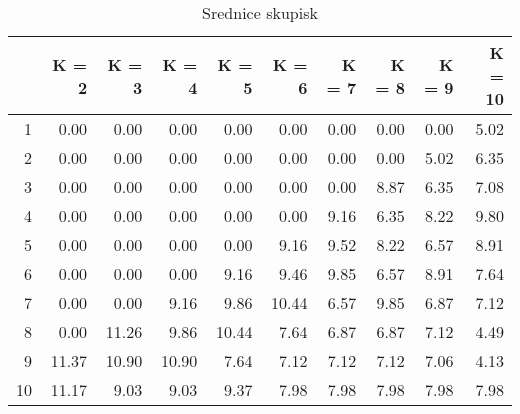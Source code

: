 \begin{table}[ht]
\centering
\begin{tabular}{rrrrrrrrrr}
  \hline
 & K = 2 & K = 3 & K = 4 & K = 5 & K = 6 & K = 7 & K = 8 & K = 9 & K = 10 \\ 
  \hline
1 & 0.00 & 0.00 & 0.00 & 0.00 & 0.00 & 0.00 & 0.00 & 0.00 & 5.02 \\ 
  2 & 0.00 & 0.00 & 0.00 & 0.00 & 0.00 & 0.00 & 0.00 & 5.02 & 6.35 \\ 
  3 & 0.00 & 0.00 & 0.00 & 0.00 & 0.00 & 0.00 & 8.87 & 6.35 & 7.08 \\ 
  4 & 0.00 & 0.00 & 0.00 & 0.00 & 0.00 & 9.16 & 6.35 & 8.22 & 9.80 \\ 
  5 & 0.00 & 0.00 & 0.00 & 0.00 & 9.16 & 9.52 & 8.22 & 6.57 & 8.91 \\ 
  6 & 0.00 & 0.00 & 0.00 & 9.16 & 9.46 & 9.85 & 6.57 & 8.91 & 7.64 \\ 
  7 & 0.00 & 0.00 & 9.16 & 9.86 & 10.44 & 6.57 & 9.85 & 6.87 & 7.12 \\ 
  8 & 0.00 & 11.26 & 9.86 & 10.44 & 7.64 & 6.87 & 6.87 & 7.12 & 4.49 \\ 
  9 & 11.37 & 10.90 & 10.90 & 7.64 & 7.12 & 7.12 & 7.12 & 7.06 & 4.13 \\ 
  10 & 11.17 & 9.03 & 9.03 & 9.37 & 7.98 & 7.98 & 7.98 & 7.98 & 7.98 \\ 
   \hline
\end{tabular}
\caption{Srednice skupisk} 
\end{table}
